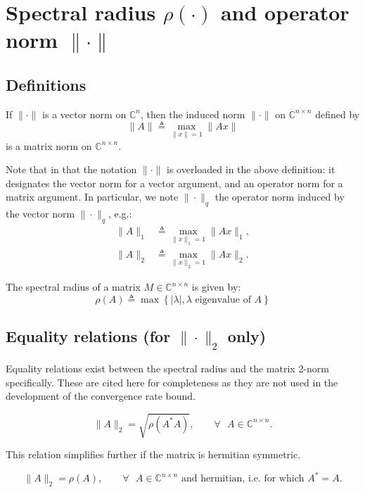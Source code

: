 \documentclass{article}
\begin{document}
\pagebreak

\appendix
%
\section{Spectral radius $\rho(\cdot)$ and operator norm $\| \cdot \|$}
\label{sec:matrix_norm_and_spectral_radius}
\subsection*{Definitions}
\begin{defn}
If $\| \cdot \|$ is a vector norm on $\mathds{C}^n$, then the induced norm $\| \cdot \|$ on $\mathds{C}^{n\times n}$ defined by
\[
	\|A\| \triangleq \max_{\|x\|=1}\|Ax\|
\]
is a matrix norm on $\mathds{C}^{n\times n}$. 
\end{defn} 
\par Note that in that the notation $\| \cdot \|$ is overloaded in the above definition: it designates the vector norm for a vector argument, and an operator norm for a matrix argument. In particular, we note $\| \cdot \|_q$ the operator norm induced by the vector norm $\| \cdot \|_q$, e.g.:
\begin{align}
	\|A\|_1 &\triangleq \max_{\|x\|_1=1}\|Ax\|_1, \nonumber \\
	\|A\|_2 &\triangleq \max_{\|x\|_2=1}\|Ax\|_2. \nonumber
\end{align}

\begin{defn}
The spectral radius of a matrix $M\in \mathds{C}^{n\times n}$ is given by:
\[
	\rho(A) \triangleq \max \left\{ |\lambda|, \lambda \text{ eigenvalue of }A\right\}
\]
\end{defn}

\subsection*{Equality relations (for $\| \cdot \|_2$ only)}
Equality relations exist between the spectral radius and the matrix 2-norm specifically. These are cited here for completeness as they are not used in the development of the convergence rate bound.
\begin{thm}
\label{th_eq_sprad_m2nrm}
\[
	\|A\|_2 = \sqrt{\rho(A^*A)}, \qquad \forall \text{ } A \in \mathds{C}^{n\times n}. 
\]
\end{thm}
\par This relation simplifies further if the matrix is hermitian symmetric.
\begin{thm}
\[
	\|A\|_2 = \rho(A), \qquad \forall \text{ } A \in \mathds{C}^{n\times n} \text{ and  hermitian, i.e. for which } A^*=A.
\]
\end{thm}
\end{document}
